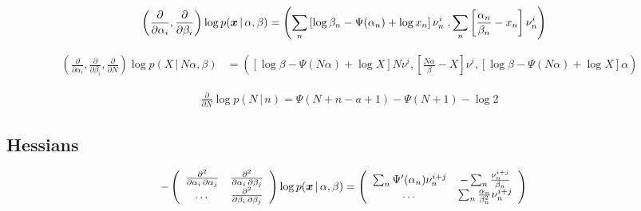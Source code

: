 \documentclass[11pt]{article}
\newcommand{\cond}{\,|\,}
\newcommand{\firstDeriv}[1]{\frac{\partial}{\partial #1}}
\newcommand{\secPartial}[2]{\frac{\partial^2}{\partial #1 \, \partial #2}} %
\begin{document}
\begin{align}
  \label{eq:grad-posterior}
  \left( \firstDeriv{\alpha_i}, \firstDeriv{\beta_i} \right) \log p(\bmx \cond \alpha, \beta) &=
  \left(
    \sum_n \left[ \log \beta_n - \Psi(\alpha_n) + \log x_n \right] \nu_n^i \;,
    \sum_n \left[ \frac{\alpha_n}{\beta_n} - x_n \right]\nu_n^i
  \right)
\end{align}

\begin{align}
  \label{eq:grad-prediction}
  \left( \firstDeriv{\alpha_i}, \firstDeriv{\beta_i}, \firstDeriv{N} \right) \log p(X \cond N \alpha, \beta)  &=
  \left(
    \left[ \log \beta - \Psi(N \alpha) + \log X \right] N \nu^i,
    \left[ \frac{N\alpha}{\beta} - X \right]\nu^i,
    \left[ \log \beta -\Psi(N \alpha) + \log X \right] \alpha
  \right)
\end{align}

\begin{align}
  \label{eq:grad-nb}
  \firstDeriv{N} \log p(N \cond n) = \Psi(N+n-a+1) - \Psi(N+1) - \log 2
\end{align}

\subsection{Hessians} \label{sec:hessians}

\begin{align}
  \label{eq:hess-posterior}
    - \left(
    \begin{array}{ccc}
      \secPartial{\alpha_i}{\alpha_j} & \secPartial{\alpha_i}{\beta_j}\\
      \dots & \secPartial{\beta_i}{\beta_j}
    \end{array}
  \right) \log p(\bmx \cond \alpha, \beta)
    &= \left(
    \begin{array}{cc}
      \sum_n \Psi'(\alpha_n) \nu_n^{i+j} & -\sum_n \frac{\nu_n^{i+j}}{\beta_n}\\
      \dots & \sum_n \frac{\alpha_n}{\beta_n^2} \nu_n^{i+j}
    \end{array}
  \right)
\end{align}
\end{document}

